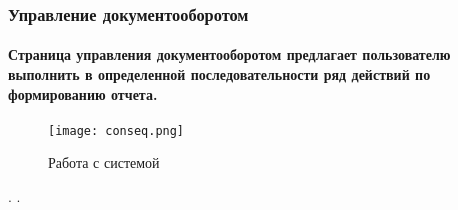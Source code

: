 \documentclass{article}
\begin{document}
   \newpage
   
        \subsubsection{Управление документооборотом}
            \paragraph{Страница управления документооборотом предлагает пользователю выполнить в определенной последовательности ряд действий по формированию отчета.}
            
            \begin{figure}[ht]
                \centering
                \texttt{[image: conseq.png]}
                \caption{Работа с системой}
                \label{fig:howtouse}
            \end{figure}
            
\newpage


\cite{5768414}.
\cite{7480156}.
\cite{5768412}
\cite{6568293}
\cite{5768459}



\end{document}
